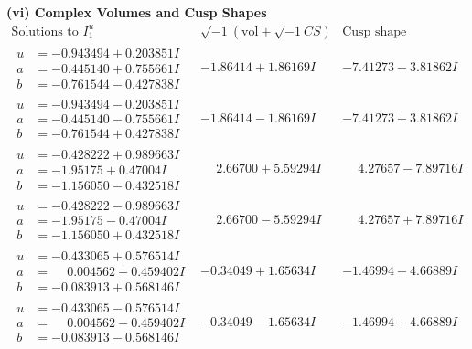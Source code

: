 \documentclass[1p]{elsarticle_modified}
\theoremstyle{definition}
\newcommand{\I}{\sqrt{-1}}
\begin{document}
\newpage\flushleft \textbf{(vi) Complex Volumes and Cusp Shapes}
$$\begin{array}{c|c|c}  
\text{Solutions to }I^u_{1}& \I (\text{vol} + \sqrt{-1}CS) & \text{Cusp shape}\\
 \hline 
\begin{aligned}
u &= -0.943494 + 0.203851 I \\
a &= -0.445140 + 0.755661 I \\
b &= -0.761544 - 0.427838 I\end{aligned}
 & -1.86414 + 1.86169 I & -7.41273 - 3.81862 I \\ \hline\begin{aligned}
u &= -0.943494 - 0.203851 I \\
a &= -0.445140 - 0.755661 I \\
b &= -0.761544 + 0.427838 I\end{aligned}
 & -1.86414 - 1.86169 I & -7.41273 + 3.81862 I \\ \hline\begin{aligned}
u &= -0.428222 + 0.989663 I \\
a &= -1.95175 + 0.47004 I \\
b &= -1.156050 - 0.432518 I\end{aligned}
 & \phantom{-}2.66700 + 5.59294 I & \phantom{-}4.27657 - 7.89716 I \\ \hline\begin{aligned}
u &= -0.428222 - 0.989663 I \\
a &= -1.95175 - 0.47004 I \\
b &= -1.156050 + 0.432518 I\end{aligned}
 & \phantom{-}2.66700 - 5.59294 I & \phantom{-}4.27657 + 7.89716 I \\ \hline\begin{aligned}
u &= -0.433065 + 0.576514 I \\
a &= \phantom{-}0.004562 + 0.459402 I \\
b &= -0.083913 + 0.568146 I\end{aligned}
 & -0.34049 + 1.65634 I & -1.46994 - 4.66889 I \\ \hline\begin{aligned}
u &= -0.433065 - 0.576514 I \\
a &= \phantom{-}0.004562 - 0.459402 I \\
b &= -0.083913 - 0.568146 I\end{aligned}
 & -0.34049 - 1.65634 I & -1.46994 + 4.66889 I \\ \hline\begin{aligned}

\end{aligned}
\end{array}$$
\end{document}
